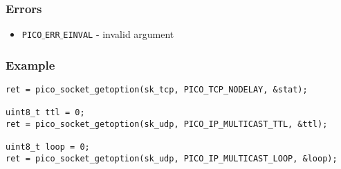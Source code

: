 \subsubsection*{Errors}
\begin{itemize}[noitemsep]
\item \texttt{PICO$\_$ERR$\_$EINVAL} - invalid argument
\end{itemize}

\subsubsection*{Example}
\begin{verbatim}
ret = pico_socket_getoption(sk_tcp, PICO_TCP_NODELAY, &stat);

uint8_t ttl = 0;
ret = pico_socket_getoption(sk_udp, PICO_IP_MULTICAST_TTL, &ttl);

uint8_t loop = 0;
ret = pico_socket_getoption(sk_udp, PICO_IP_MULTICAST_LOOP, &loop);
\end{verbatim}
